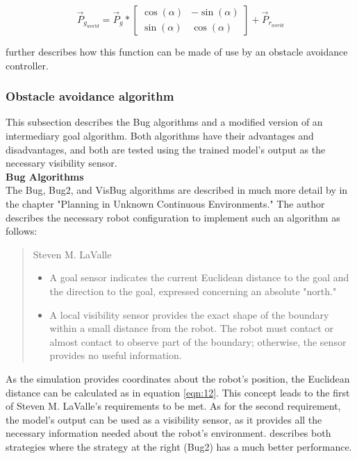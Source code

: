 \begin{equation}
\label{eqn:13} 
\vec{P}_{g_{world}}=
\vec{P}_{g}*
  \begin{bmatrix}
    \cos(\alpha) & -\sin(\alpha)\\
    \sin(\alpha) & \cos(\alpha)
  \end{bmatrix}+
\vec{P}_{r_{world}}
\end{equation}

 further describes how this function can be made of use by an obstacle avoidance controller.

\subsubsection{Obstacle avoidance algorithm \label{obstacle_avoidance}}
This subsection describes the Bug algorithms and a modified version of an intermediary goal algorithm. Both algorithms have their advantages and disadvantages, and both are tested using the trained model's output as the necessary visibility sensor.\\

\textbf{Bug Algorithms}\\
The Bug, Bug2, and VisBug algorithms are described in much more detail by \cite{lavalle2006planning} in the chapter "Planning in Unknown Continuous Environments." The author describes the necessary robot configuration to implement such an algorithm as follows:

\begin{quote}{Steven M. LaValle}
\begin{itemize}
\item  A goal sensor indicates the current Euclidean distance to the goal and the direction to the goal, expressed concerning an absolute "north."
\item A local visibility sensor provides the exact shape of the boundary within a small distance from the robot. The robot must contact or almost contact to observe part of the boundary; otherwise, the sensor provides no useful information.
\end{itemize}
\end{quote}

As the simulation provides coordinates about the robot's position, the Euclidean distance can be calculated as in equation \ref{eqn:12}. This concept leads to the first of Steven M. LaValle's requirements to be met. As for the second requirement, the model's output can be used as a visibility sensor, as it provides all the necessary information needed about the robot's environment.  describes both strategies where the strategy at the right (Bug2) has a much better performance.

